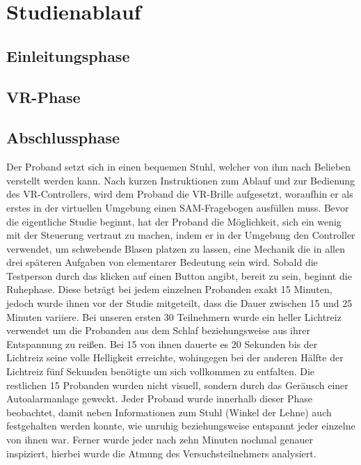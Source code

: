 \section{Studienablauf}
\subsection{Einleitungsphase}
\subsection{VR-Phase}
\subsection{Abschlussphase}
Der Proband setzt sich in einen bequemen Stuhl, welcher von ihm nach Belieben verstellt werden kann. Nach kurzen Instruktionen zum Ablauf und zur Bedienung des VR-Controllers, wird dem Proband die VR-Brille aufgesetzt, woraufhin er als erstes in der virtuellen Umgebung einen SAM-Fragebogen ausfüllen muss. %
Bevor die eigentliche Studie beginnt, hat der Proband die Möglichkeit, sich ein wenig mit der Steuerung vertraut zu machen, indem er in der Umgebung den Controller verwendet, um schwebende Blasen platzen zu lassen, eine Mechanik die in allen drei späteren Aufgaben von elementarer Bedeutung sein wird. Sobald die Testperson durch das klicken auf einen Button angibt, bereit zu sein, beginnt die Ruhephase. Diese beträgt bei jedem einzelnen Probanden exakt 15 Minuten, jedoch wurde ihnen vor der Studie mitgeteilt, dass die Dauer zwischen 15 und 25 Minuten variiere. %
Bei unseren ersten 30 Teilnehmern wurde ein heller Lichtreiz verwendet um die Probanden aus dem Schlaf beziehungsweise aus ihrer Entspannung zu reißen. Bei 15 von ihnen dauerte es 20 Sekunden bis der Lichtreiz seine volle Helligkeit erreichte, wohingegen bei der anderen Hälfte der Lichtreiz fünf Sekunden benötigte um sich vollkommen zu entfalten.  Die restlichen 15 Probanden wurden nicht visuell, sondern durch das Geräusch einer Autoalarmanlage geweckt. %
Jeder Proband wurde innerhalb dieser Phase beobachtet, damit neben Informationen zum Stuhl (Winkel der Lehne) auch festgehalten werden konnte, wie unruhig beziehungsweise entspannt jeder einzelne von ihnen war. Ferner wurde jeder nach zehn Minuten nochmal genauer inspiziert, hierbei wurde die Atmung des Versuchsteilnehmers analysiert.
